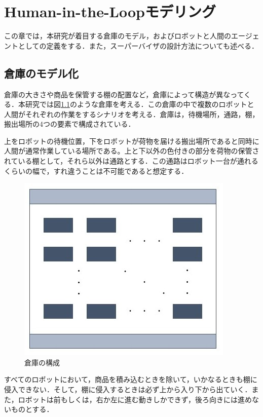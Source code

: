 \chapter{Human-in-the-Loopモデリング}

この章では，本研究が着目する倉庫のモデル，およびロボットと人間のエージェントとしての定義をする．また，スーパーバイザの設計方法についても述べる．

\section{倉庫のモデル化}

倉庫の大きさや商品を保管する棚の配置など，倉庫によって構造が異なってくる．本研究では図\ref{fig:Warehouse_gen}のような倉庫を考える．この倉庫の中で複数のロボットと人間がそれぞれの作業をするシナリオを考える．倉庫は，待機場所，通路，棚，搬出場所の4つの要素で構成されている．

上をロボットの待機位置，下をロボットが荷物を届ける搬出場所であると同時に人間が通常作業している場所である。上と下以外の色付きの部分を荷物の保管されている棚として，それら以外は通路とする．この通路はロボット一台が通れるくらいの幅で，すれ違うことは不可能であると想定する．

\begin{figure}[h]
    \centering
    \includegraphics[scale=0.5]{figures/Warehouse_gen.jpg}
    \caption{倉庫の構成}
    \label{fig:Warehouse_gen}
\end{figure}

すべてのロボットにおいて，商品を積み込むときを除いて，いかなるときも棚に侵入できない．そして，棚に侵入するときは必ず上から入り下から出ていく．また，ロボットは前もしくは，右か左に進む動きしかできず，後ろ向きには進めないものとする．

